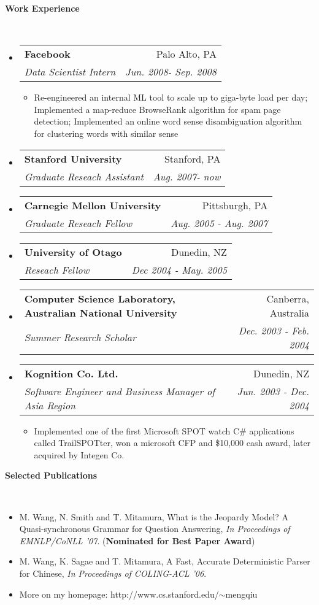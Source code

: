\documentclass[letterpaper,11pt]{article}
\makeatletter
\newcommand{\resitem}[1]{\item #1 \vspace{-2pt}}
\newcommand{\ressubheading}[4]{
\begin{tabular*}{6.5in}{l@{\extracolsep{\fill}}r}
		\textbf{#1} & #2 \\
		\textit{#3} & \textit{#4} \\
\end{tabular*}\vspace{-6pt}}
\makeatother
\begin{document}
\vspace{0.1in}
\begin{large}\textbf{Work Experience}\end{large}\\
\begin{itemize}
\item
	\ressubheading{Facebook}{Palo Alto, PA}{Data Scientist Intern}{Jun. 2008- Sep. 2008}
	\begin{itemize}
		\resitem{Re-engineered an internal ML tool to scale up to giga-byte load per day; Implemented a map-reduce BrowseRank algorithm for spam page detection; Implemented an online word sense disambiguation algorithm for clustering words with similar sense}
	\end{itemize}
\item
	\ressubheading{Stanford University}{Stanford, PA}{Graduate Reseach Assistant}{Aug. 2007- now}
\item
	\ressubheading{Carnegie Mellon University}{Pittsburgh, PA}{Graduate Reseach Fellow}{Aug. 2005 - Aug. 2007}
\item
	\ressubheading{University of Otago}{Dunedin, NZ}{Reseach Fellow}{Dec 2004 - May. 2005}
\item
	\ressubheading{Computer Science Laboratory, Australian National University}{Canberra, Australia}{Summer Research Scholar}{Dec. 2003 - Feb. 2004}
\item
	\ressubheading{Kognition Co. Ltd.}{Dunedin, NZ}{Software Engineer and Business Manager of Asia Region}{Jun. 2003 - Dec. 2004}
	\begin{itemize}
		\resitem{Implemented one of the first Microsoft SPOT watch C\# applications called TrailSPOTter, won a microsoft CFP and \$10,000 cash award, later acquired by Integen Co.}
	\end{itemize}
\end{itemize}

\vspace{0.1in}
\begin{large}\textbf{Selected Publications}\end{large}\\
\begin{itemize}
\item M. Wang, N. Smith and T. Mitamura, What is the Jeopardy Model? A Quasi-synchronous Grammar for Question Answering, \textit{In Proceedings of EMNLP/CoNLL '07}. (\textbf{Nominated for Best Paper Award})

\item M. Wang, K. Sagae and T. Mitamura, A Fast, Accurate Deterministic Parser for Chinese, \textit{In Proceedings of COLING-ACL '06}.

\item More on my homepage: http://www.cs.stanford.edu/$\sim$mengqiu

\end{itemize}
\end{document}
